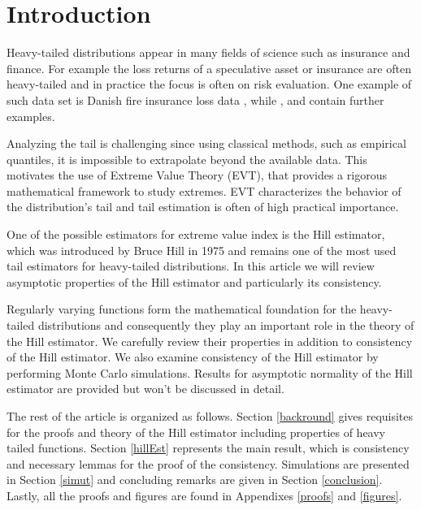 \documentclass[english,12pt,a4paper,pdftex,sci,utf8]{aaltothesis} %
\begin{document}
\cleardoublepage

\section{Introduction}

Heavy-tailed distributions appear in many fields of science such as insurance and finance. For example the loss returns of a speculative asset or insurance are often heavy-tailed and in practice the focus is often on risk evaluation. One example of such data set is Danish fire insurance loss data \cite{mcneil}  \cite{resnickFire}, while \cite{resnick}, \cite{deHaan} and \cite{embrechts} contain further examples.

Analyzing the tail is challenging since using classical methods, such as empirical quantiles, it is impossible to extrapolate beyond the available data. This motivates the use of Extreme Value Theory (EVT), that provides a rigorous mathematical framework to study extremes. EVT characterizes the behavior of the distribution's tail and tail estimation is often of high practical importance.

One of the possible estimators for extreme value index is the Hill estimator, which was introduced by Bruce Hill in 1975 \cite{hill} and remains one of the most used tail estimators for heavy-tailed distributions.
In this article we will review asymptotic properties of the Hill estimator and particularly its consistency.

Regularly varying functions form the mathematical foundation for the heavy-tailed distributions and consequently they play an important role in the theory of the Hill estimator. We carefully review their properties in addition to consistency of the Hill estimator. We also examine consistency of the Hill estimator by performing Monte Carlo simulations. Results for asymptotic normality of the Hill estimator are provided but won’t be discussed in detail.

The rest of the article is organized as follows. Section \ref{backround} gives requisites for the proofs and theory of the Hill estimator including properties of heavy tailed functions. Section \ref{hillEst} represents the main result, which is consistency and necessary lemmas for the proof of the consistency. Simulations are presented in Section \ref{simut} and concluding remarks are given in Section \ref{conclusion}. Lastly, all the proofs and figures are found in Appendixes \ref{proofs} and \ref{figures}.
\end{document}
